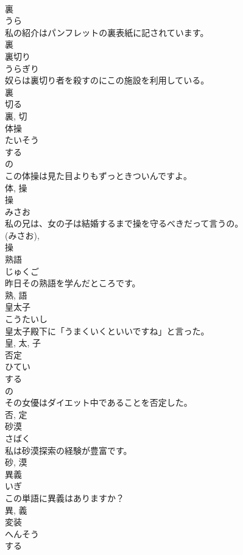 \documentclass[8pt]{extreport}
\begin{document}
\begin{CJK}{UTF8}{min}
\\	裏	
\\	うら	
\\	私の紹介はパンフレットの裏表紙に記されています。	
\\	裏	
\\	裏切り	
\\	うらぎり	
\\	奴らは裏切り者を殺すのにこの施設を利用している。	
\\	裏 
\\	切る
\\	裏, 切	
\\	体操	
\\	たいそう	
\\	する 
\\	の 
\\	この体操は見た目よりもずっときついんですよ。	
\\	体, 操	
\\	操	
\\	みさお	
\\	私の兄は、女の子は結婚するまで操を守るべきだって言うの。	
\\	(みさお), 
\\	操	
\\	熟語	
\\	じゅくご	
\\	昨日その熟語を学んだところです。	
\\	熟, 語	
\\	皇太子	
\\	こうたいし	
\\	皇太子殿下に「うまくいくといいですね」と言った。	
\\	皇, 太, 子	
\\	否定	
\\	ひてい	
\\	する 
\\	の 
\\	その女優はダイエット中であることを否定した。	
\\	否, 定	
\\	砂漠	
\\	さばく	
\\	私は砂漠探索の経験が豊富です。	
\\	砂, 漠	
\\	異義	
\\	いぎ	
\\	この単語に異義はありますか？	
\\	異, 義	
\\	変装	
\\	へんそう	
\\	する 

\end{CJK}
\end{document}
